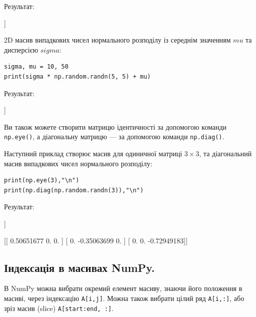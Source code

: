 Результат:

\begin{console}
[[-0.72206547  0.26200423  1.45715136 -1.25955877]
 [-0.01199544  0.27812632  2.34386974  0.1253467 ]
 [ 1.60420367  1.11023166  1.34434453  0.87136904]]
\end{console}

2D масив випадкових чисел нормального розподілу із середнім значенням $mu$ та дисперсією $sigma$:

\begin{lstlisting}
sigma, mu = 10, 50
print(sigma * np.random.randn(5, 5) + mu)
\end{lstlisting}

Результат:

\begin{console}
[[54.73972213 58.44438959 49.52225911 61.93038812 62.89356473]
 [58.20297378 54.47071892 53.323917   46.94830739 54.82418092]
 [61.0468657  30.48331679 57.33545183 84.93594736 55.92995469]
 [52.76434983 56.28182261 48.24665623 50.28029835 57.08573032]
 [44.30725611 48.51274777 40.88648182 36.13557207 55.81138676]]
\end{console}


Ви також можете створити матрицю ідентичності за допомогою команди \verb|np.eye()|, а діагональну матрицю — за допомогою команди \verb|np.diag()|.

Наступний приклад створює масив для одиничної матриці $3\times 3$, та діагональний масив випадкових чисел нормального розподілу:

\begin{lstlisting}
print(np.eye(3),"\n")
print(np.diag(np.random.randn(3)),"\n")
\end{lstlisting}

Результат:

\begin{console}
[[1. 0. 0.]
 [0. 1. 0.]
 [0. 0. 1.]] 

[[ 0.50651677  0.          0.        ]
 [ 0.         -0.35063699  0.        ]
 [ 0.          0.         -0.72949183]] 
\end{console}



\subsection{Індексація в масивах NumPy.}

В NumPy можна вибрати окремий елемент масиву, знаючи його положення в масиві, через індексацію \verb|A[i,j]|. Можна також вибрати цілий ряд \verb|A[i,:]|, або зріз масив (slice) \verb|A[start:end, :]|.

